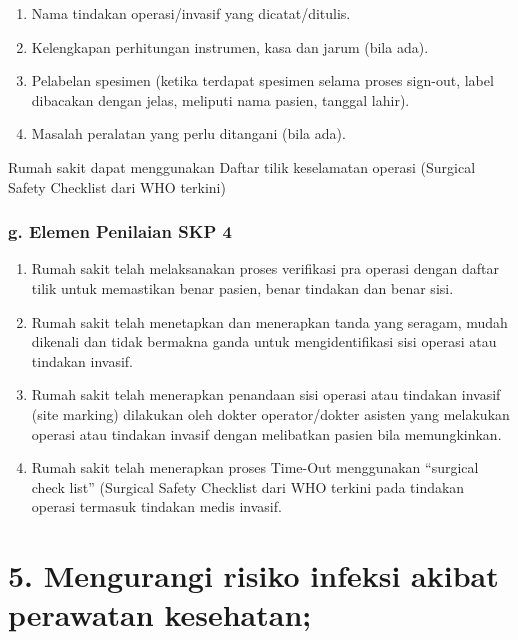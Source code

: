 \documentclass[
]{book}
\providecommand{\tightlist}{%
  \setlength{\itemsep}{0pt}\setlength{\parskip}{0pt}}
\begin{document}
\begin{enumerate}
\def\labelenumi{\arabic{enumi}.}
\tightlist
\item
  Nama tindakan operasi/invasif yang dicatat/ditulis.
\item
  Kelengkapan perhitungan instrumen, kasa dan jarum (bila ada).
\item
  Pelabelan spesimen (ketika terdapat spesimen selama proses sign-out, label dibacakan dengan jelas, meliputi nama pasien, tanggal lahir).
\item
  Masalah peralatan yang perlu ditangani (bila ada).
\end{enumerate}

Rumah sakit dapat menggunakan Daftar tilik keselamatan operasi (Surgical Safety Checklist dari WHO terkini)

\hypertarget{g.-elemen-penilaian-skp-4}{%
\subsubsection*{g. Elemen Penilaian SKP 4}\label{g.-elemen-penilaian-skp-4}}

\begin{enumerate}
\def\labelenumi{\arabic{enumi}.}
\tightlist
\item
  Rumah sakit telah melaksanakan proses verifikasi pra operasi dengan daftar tilik untuk memastikan benar pasien, benar tindakan dan benar sisi.
\item
  Rumah sakit telah menetapkan dan menerapkan tanda yang seragam, mudah dikenali dan tidak bermakna ganda untuk mengidentifikasi sisi operasi atau tindakan invasif.
\item
  Rumah sakit telah menerapkan penandaan sisi operasi atau tindakan invasif (site marking) dilakukan oleh dokter operator/dokter asisten yang melakukan operasi atau tindakan invasif dengan melibatkan pasien bila memungkinkan.
\item
  Rumah sakit telah menerapkan proses Time-Out menggunakan ``surgical check list'' (Surgical Safety Checklist dari WHO terkini pada tindakan operasi termasuk tindakan medis invasif.
\end{enumerate}

\hypertarget{mengurangi-risiko-infeksi-akibat-perawatan-kesehatan}{%
\section*{5. Mengurangi risiko infeksi akibat perawatan kesehatan;}\label{mengurangi-risiko-infeksi-akibat-perawatan-kesehatan}}
\end{document}
